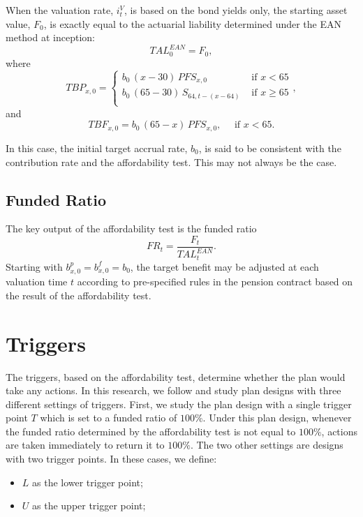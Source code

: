 \documentclass{sfuthesis}
\numberwithin{equation}{chapter}
\begin{document}
	
		\justify
		When the valuation rate, $i_{t}^{V}$, is based on the bond yields only, the starting asset value, $F_{0}$, is exactly equal to the actuarial liability determined under the EAN method at inception:
		\begin{equation}
		\label{eq:STBP_29}
		TAL_{0}^{EAN} = F_{0},
		\end{equation}
		where
		\begin{equation}
		\label{eq:STBP_30}
		TBP_{x,0} =
		\left \{
		\begin{array}{ll}
		b_{0} \, (x-30) \, PFS_{x,0} &\text{ if } x<65 \\
		
		b_{0} \, (65-30) \, S_{64, t-(x-64)} &\text{ if } x\geqslant 65\\
		\end{array}
		\right.,
		\end{equation}
		and
		\begin{equation}
		\label{eq:STBP_31}
		TBF_{x,0} = b_{0}\,(65-x)\,PFS_{x,0}, \quad \text{ if } x<65.
		\end{equation}
	
	
		\justify
		In this case, the initial target accrual rate, $b_{0}$, is said to be consistent with the contribution rate and the affordability test. This may not always be the case.
	
	
	\subsection{Funded Ratio}
	\label{Funded Ratio}
	
		\justify
		The key output of the affordability test is the funded ratio 
		\begin{equation}
		\label{eq:STBP_32}
		FR_{t} = \frac{F_{t}}{TAL^{EAN}_{t}}.
		\end{equation}
		Starting with $b_{x,0}^p = b_{x,0}^f = b_{0}$, the target benefit may be adjusted at each valuation time $t$ according to pre-specified rules in the pension contract based on the result of the affordability test.
	
	
	\section{Triggers}
	\label{Triggers}
	
		\justify
		The triggers, based on the affordability test, determine whether the plan would take any actions. In this research, we follow \citet{Sanders2016a} and study plan designs with three different settings of triggers. First, we study the plan design with a single trigger point $T$ which is set to a funded ratio of $100\%$. Under this plan design, whenever the funded ratio determined by the affordability test is not equal to $100\%$, actions are taken immediately to return it to $100\%$. The two other settings are designs with two trigger points. In these cases, we define:
		\begin{itemize}
			\item $L$ as the lower trigger point;
			\item $U$ as the upper trigger point;
		\end{itemize}
\end{document}
